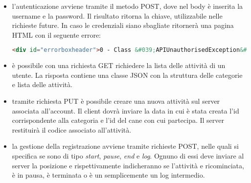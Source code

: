 \begin{itemize}
  \item l'autenticazione avviene tramite il metodo POST, dove nel body è inserita la username e la password. Il
  risultato ritorna la chiave, utilizzabile nelle richieste future. In caso le credenziali siano sbagliate ritornerà una
  pagina HTML con il seguente errore:

  \begin{lstlisting}[language=HTML]
    <div id="errorboxheader">0 - Class &#039;APIUnauthorisedException&#039; not found</div>
  \end{lstlisting}
  \item è possibile con una richiesta GET richiedere la lista delle attività di un utente. La risposta contiene una
  classe JSON con la struttura delle categorie e lista delle attività. 
  \item tramite richiesta PUT è possibile creare una nuova attività sul server associata all'account. Il client dovrà
  inviare la data in cui è stata creata l'id corrispondente alla categoria e l'id del cane con cui partecipa. Il server
  restituirà il codice associato all'attività.
  \item la gestione della registrazione avviene tramite richieste POST, nelle quali si specifica se sono di tipo
  \textit{start}, \textit{pause}, \textit{end} e \textit{log}. Ognuno di essi deve inviare al server la posizione e
  rispettivamente indicheranno se l'attività e ricominciata, è in pausa, è terminata o è un semplicemente un log intermedio.
\end{itemize}


